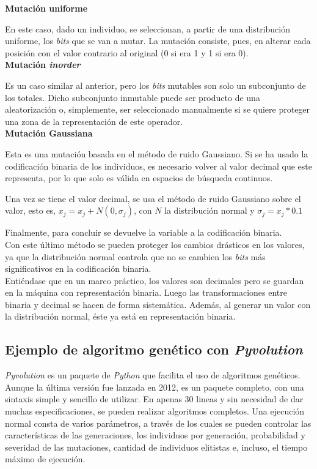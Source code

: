 			\textbf{Mutaci\'on uniforme}

			En este caso, dado un individuo, se seleccionan, a partir de una distribuci\'on uniforme, los \textit{bits} que se van a mutar. La mutaci\'on consiste, pues, en alterar cada posici\'on con el valor contrario al original (0 si era 1 y 1 si era 0).\\			
		
		
			\textbf{Mutaci\'on \textit{inorder}}
		
			Es un caso similar al anterior, pero los \textit{bits} mutables son solo un subconjunto de los totales. Dicho subconjunto inmutable puede ser producto de una aleatorizaci\'on o, simplemente, ser seleccionado manualmente si se quiere proteger una zona de la representaci\'on de este operador.\\
			

			\textbf{Mutaci\'on Gaussiana}

			Esta es una mutaci\'on basada en el m\'etodo de ruido Gaussiano. Si se ha usado la codificaci\'on binaria de los individuos, es necesario volver al valor decimal que este representa, por lo que solo es v\'alida en espacios de b\'usqueda continuos.
			
			Una vez se tiene el valor decimal, se usa el m\'etodo de ruido Gaussiano sobre el valor, esto es, $x_j = x_j + N(0,\sigma_j)$, con $N$ la distribuci\'on normal y $\sigma_j = x_j * 0.1$
			
			Finalmente, para concluir se devuelve la variable a la codificaci\'on binaria.\\
			
			Con este \'ultimo m\'etodo se pueden proteger los cambios dr\'asticos en los valores, ya que la distribuci\'on normal controla que no se cambien los \textit{bits} m\'as significativos en la codificaci\'on binaria.\\
			
			Enti\'endase que en un marco pr\'actico, los valores son decimales pero se guardan en la m\'aquina con representaci\'on binaria. Luego las transformaciones entre binaria y decimal se hacen de forma sistem\'atica. Adem\'as, al generar un valor con la distribuci\'on normal, \'este ya est\'a en representaci\'on binaria.  
							
		\subsection{Ejemplo de algoritmo gen\'etico con \textit{Pyvolution}}
		
		\textit{Pyvolution} es un paquete de \textit{Python} que facilita el uso de algoritmos gen\'eticos. Aunque la \'ultima versi\'on fue lanzada en 2012, es un paquete completo, con una sintaxis simple y sencillo de utilizar. En apenas 30 lineas y sin necesidad de dar muchas especificaciones, se pueden realizar algoritmos completos. Una ejecuci\'on normal consta de varios par\'ametros, a trav\'es de los cuales se pueden controlar las caracter\'isticas de las generaciones, los individuos por generaci\'on, probabilidad y severidad de las mutaciones, cantidad de individuos elitistas e, incluso, el tiempo m\'aximo de ejecuci\'on.\\
		
